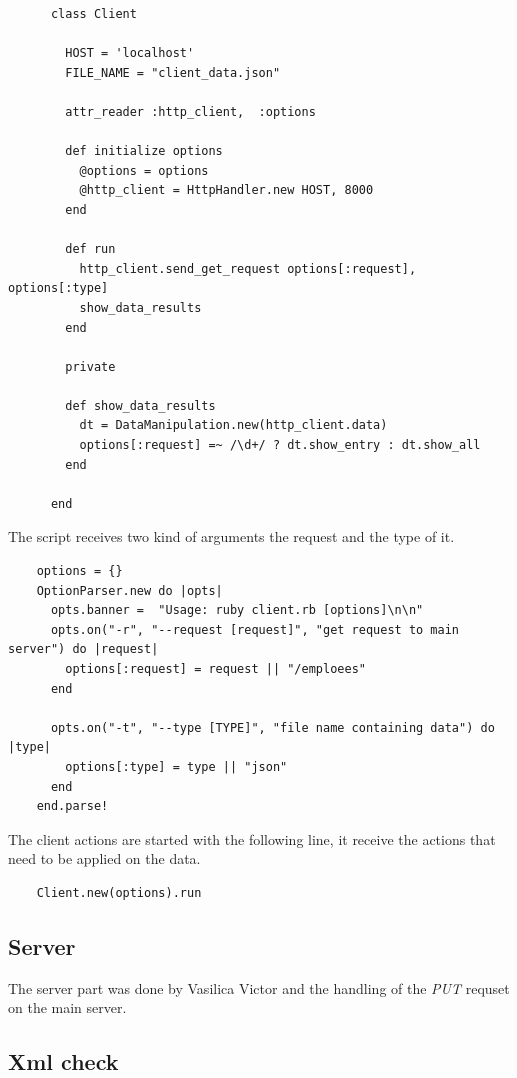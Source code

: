 \documentclass[12pt]{article}
\begin{document}
    \begin{lstlisting}
      class Client

        HOST = 'localhost'
        FILE_NAME = "client_data.json"

        attr_reader :http_client,  :options

        def initialize options
          @options = options
          @http_client = HttpHandler.new HOST, 8000
        end

        def run
          http_client.send_get_request options[:request], options[:type]
          show_data_results
        end

        private

        def show_data_results
          dt = DataManipulation.new(http_client.data)
          options[:request] =~ /\d+/ ? dt.show_entry : dt.show_all
        end

      end
    \end{lstlisting}

    The script receives two kind of arguments the request and the type of it.

    \begin{lstlisting}
    options = {}
    OptionParser.new do |opts|
      opts.banner =  "Usage: ruby client.rb [options]\n\n"
      opts.on("-r", "--request [request]", "get request to main server") do |request|
        options[:request] = request || "/emploees"
      end

      opts.on("-t", "--type [TYPE]", "file name containing data") do |type|
        options[:type] = type || "json"
      end
    end.parse!
    \end{lstlisting}

    The client actions are started with the following line, it receive
    the actions that need to be applied on the data.

    \begin{lstlisting}
    Client.new(options).run
    \end{lstlisting}

    \subsection{Server}

    The server part was done by Vasilica Victor and the handling of the \textit{PUT} requset on the main server.


    \subsection{Xml check}
\end{document}
